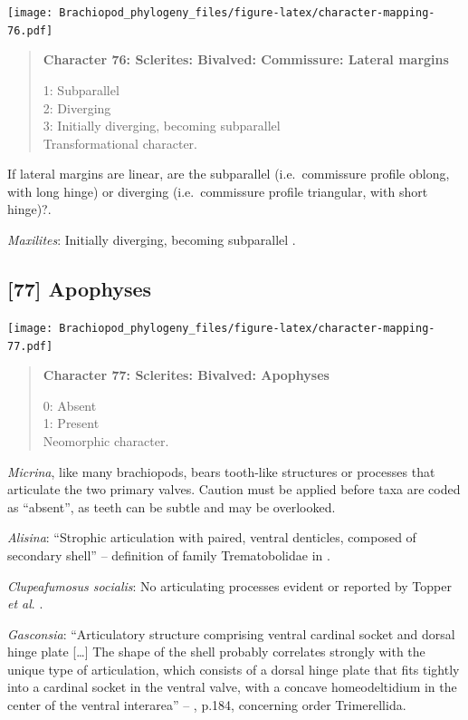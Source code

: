 \documentclass[openany]{book}
\begin{document}
\texttt{[image: Brachiopod\_phylogeny\_files/figure-latex/character-mapping-76.pdf]}

\begin{quote}
\textbf{Character 76: Sclerites: Bivalved: Commissure: Lateral margins}

1: Subparallel\\
2: Diverging\\
3: Initially diverging, becoming subparallel\\
Transformational character.
\end{quote}

If lateral margins are linear, are the subparallel (i.e.~commissure
profile oblong, with long hinge) or diverging (i.e.~commissure profile
triangular, with short hinge)?.

\hypertarget{Maxilites-coding-76}{}
\emph{Maxilites}: Initially diverging, becoming subparallel
\citep{MartiMus2005}.

\subsection*{{[}77{]} Apophyses}\label{apophyses}

\texttt{[image: Brachiopod\_phylogeny\_files/figure-latex/character-mapping-77.pdf]}

\begin{quote}
\textbf{Character 77: Sclerites: Bivalved: Apophyses}

0: Absent\\
1: Present\\
Neomorphic character.
\end{quote}

\emph{Micrina}, like many brachiopods, bears tooth-like structures or
processes that articulate the two primary valves. Caution must be
applied before taxa are coded as ``absent'', as teeth can be subtle and
may be overlooked.

\hypertarget{Alisina-coding-77}{}
\emph{Alisina}: ``Strophic articulation with paired, ventral denticles,
composed of secondary shell'' -- definition of family Trematobolidae in
\citet{Williams2000LinguliformeaCraniiformea}.

\hypertarget{Clupeafumosus_socialis-coding-77}{}
\emph{Clupeafumosus socialis}: No articulating processes evident or
reported by Topper \emph{et al}. \citeyearpar{Topper2013Reappraisalof}.

\hypertarget{Gasconsia-coding-77}{}
\emph{Gasconsia}: ``Articulatory structure comprising ventral cardinal
socket and dorsal hinge plate {[}\ldots{}{]} The shape of the shell
probably correlates strongly with the unique type of articulation, which
consists of a dorsal hinge plate that fits tightly into a cardinal
socket in the ventral valve, with a concave homeodeltidium in the center
of the ventral interarea'' --
\citet{Williams2000LinguliformeaCraniiformea}, p.184, concerning order
Trimerellida.
\end{document}
